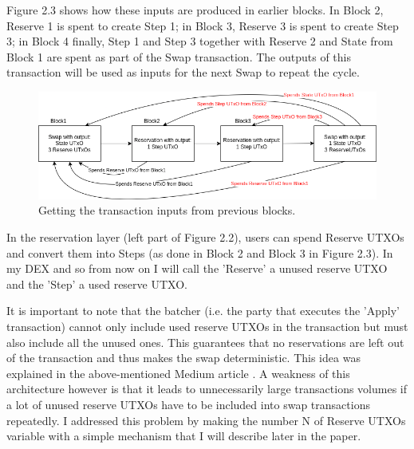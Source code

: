 \documentclass[a4paper,twoside,12pt]{report}
\begin{document}
Figure 2.3 shows how these inputs are produced in earlier blocks. In Block 2, Reserve 1 is spent to create Step 1; in Block 3, Reserve 3 is spent to create Step 3; in Block 4 finally, Step 1 and Step 3 together with Reserve 2 and State from Block 1 are spent as part of the Swap transaction. The outputs of this transaction will be used as inputs for the next Swap to repeat the cycle.

\begin{figure}[h]
\centering
\includegraphics[scale=0.58]{Swap_inthechain}
\caption{Getting the transaction inputs from previous blocks.}
\end{figure}

In the reservation layer (left part of Figure 2.2), users can spend Reserve UTXOs and convert them into Steps (as done in Block 2 and Block 3 in Figure 2.3). In my DEX and so from now on I will call the 'Reserve' a unused reserve UTXO and the 'Step' a used reserve UTXO.

It is important to note that the batcher (i.e. the party that executes the 'Apply' transaction) cannot only include used reserve UTXOs in the transaction but must also include all the unused ones. This guarantees that no reservations are left out of the transaction and thus makes the swap deterministic. This idea was explained in the above-mentioned Medium article \cite{meldConcurrencySolution}. A weakness of this architecture however is that it leads to unnecessarily large transactions volumes if a lot of unused reserve UTXOs have to be included into swap transactions repeatedly. I addressed this problem by making the number N of Reserve UTXOs variable with a simple mechanism that I will describe later in the paper.
\end{document}
